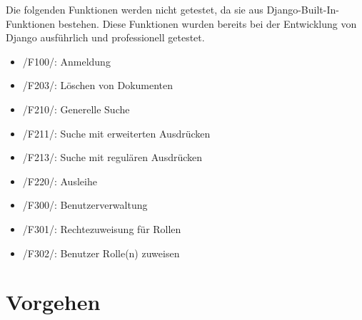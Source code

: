 Die folgenden Funktionen werden nicht getestet, da sie aus
Django-Built-In-Funktionen bestehen. Diese Funktionen wurden bereits bei der
Entwicklung von Django ausführlich und professionell getestet.

\begin{itemize}
\item /F100/: Anmeldung
\item /F203/: Löschen von Dokumenten
\item /F210/: Generelle Suche
\item /F211/: Suche mit erweiterten Ausdrücken
\item /F213/: Suche mit regulären Ausdrücken
\item /F220/: Ausleihe
\item /F300/: Benutzerverwaltung
\item /F301/: Rechtezuweisung für Rollen
\item /F302/: Benutzer Rolle(n) zuweisen
\end{itemize}

\section{Vorgehen}



